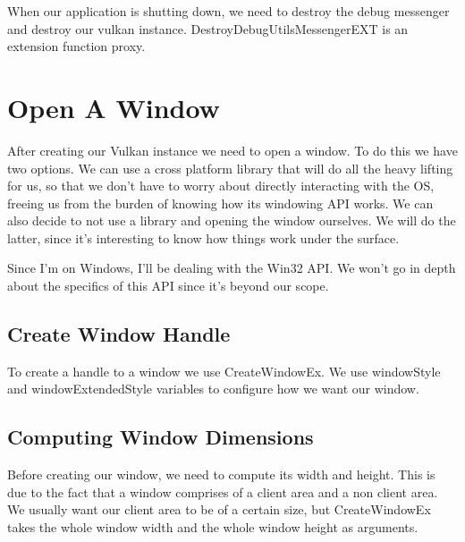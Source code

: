 When our application is shutting down, we need to destroy the debug messenger
and destroy our vulkan instance. DestroyDebugUtilsMessengerEXT is an extension
function proxy.

\begin{minipage}{\linewidth}{\noindent}
    
\end{minipage}

\section{Open A Window}

After creating our Vulkan instance we need to open a window.
To do this we have two options.
We can use a cross platform library that will do all the heavy lifting
for us, so that we don't have to worry about directly interacting with the OS,
freeing us from the burden of knowing how its windowing API works.
We can also decide to not use a library and opening the window ourselves.
We will do the latter, since it's interesting to know how things work under the surface.

Since I'm on Windows, I'll be dealing with the Win32 API.
We won't go in depth about the specifics of this API since it's beyond our scope.

\subsection{Create Window Handle}

To create a handle to a window we use CreateWindowEx.
We use windowStyle and windowExtendedStyle variables to configure how we want our window.

\begin{minipage}{\linewidth}{\noindent}
    
\end{minipage}

\subsection{Computing Window Dimensions}

Before creating our window, we need to compute its width and height.
This is due to the fact that a window comprises of a client area and a non client area.
We usually want our client area to be of a certain size, but CreateWindowEx takes
the whole window width and the whole window height as arguments.

